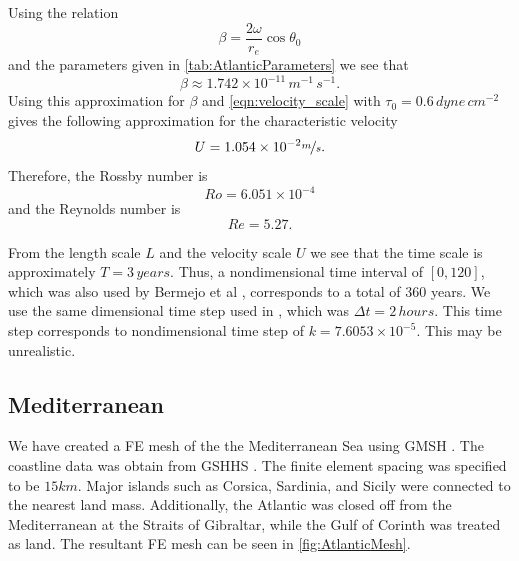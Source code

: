 Using the relation
\begin{equation}
  \beta = \frac{2\omega}{r_e}\cos \theta_0
  \label{eqn:Beta}
\end{equation}
and the parameters given in \autoref{tab:AtlanticParameters} we see that
\begin{equation*}
  \beta \approx 1.742\times 10^{-11}\, m^{-1}\,s^{-1}.
\end{equation*}
Using this approximation for $\beta$ and \eqref{eqn:velocity_scale} with
{\color{red}$\tau_0 = 0.6\, dyne\, cm^{-2}$ \cite{Hellerman} gives the following
approximation for the characteristic velocity
\begin{equation*}
    U = 1.054\times 10^{-2} \nicefrac{m}{s}.
\end{equation*}
Therefore, the Rossby number is
\begin{equation*}
  Ro = 6.051\times 10^{-4}
\end{equation*}
and the Reynolds number is
\begin{equation*}
  Re = 5.27.
\end{equation*}}

From the length scale $L$ and the velocity scale $U$ we see that the time scale
is approximately $T = 3\, years$. Thus, a nondimensional time interval of
$[0,120]$, which was also used by Bermejo et al \cite{delSastre04}, corresponds
to a total of $360$ years. We use the same dimensional time step used in
\cite{delSastre04}, which was $\Delta t = 2\, hours$. This time step corresponds
to nondimensional time step of $k = 7.6053 \times 10^{-5}$. {\color{red} This
may be unrealistic.}

\subsection{Mediterranean}
We have created a FE mesh of the the Mediterranean Sea using GMSH \cite{GMSH}. The coastline data was obtain from GSHHS \cite{GSHHS}.
The finite element spacing was specified to be {\color{red} $15km$}.  Major
islands such as Corsica, Sardinia, and Sicily were connected to the nearest land
mass. Additionally, the Atlantic was closed off from the Mediterranean at
the Straits of Gibraltar, while the Gulf of Corinth was treated as land. The
resultant FE mesh can be seen in \autoref{fig:AtlanticMesh}.

